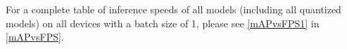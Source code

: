 For a complete table of inference speeds of all models (including all quantized
models) on all devices with a batch size of 1, please see \autoref{mAPvsFPS1} in
\autoref{mAPvsFPS}.


